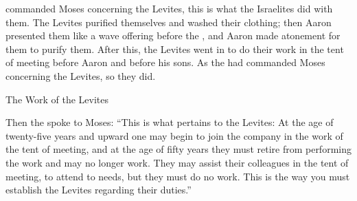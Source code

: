 {{}
commanded
Moses
concerning the Levites,
this
is what the Israelites
did with them.
The Levites
purified
themselves and washed
their clothing;
then
Aaron
presented them like
a wave offering
before
the {}, and Aaron
made atonement
for them to purify them.
After
this,
the Levites
went
in to do their work
in the tent
of meeting
before
Aaron
and before
his sons.
As
the {}
had commanded
Moses
concerning
the Levites,
so
they did.
\par }{\SH The Work of the Levites
\par }{\PP {}Then the
{}
spoke
to
Moses:
“This
is what
pertains to the Levites: At the age of twenty-five
years
and upward
one may begin to join
the company
in the work
of the tent
of meeting,
and at the age of fifty
years
they must retire
from performing
the work
and may
no
longer
work.
They may assist
their colleagues
in the tent
of meeting,
to attend
to needs,
but they must do no
work.
This
is the way you must
establish the Levites
regarding
their duties.”


}
